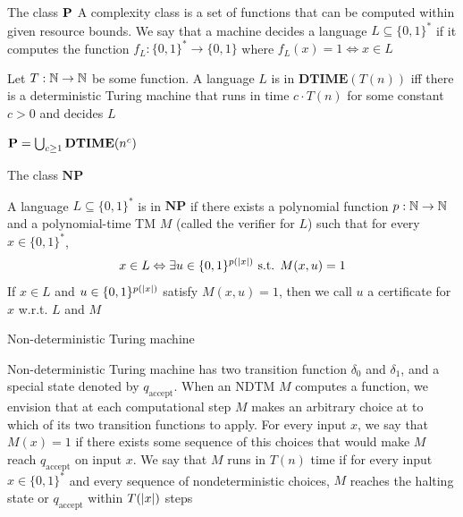 \documentclass[presentation]{beamer}
\def \NP {\textbf{NP}}
\def \DTIME {\textbf{DTIME}}
\def \NP {\textbf{NP}}
\def \accept {\text{accept}}
\begin{document}
\begin{frame}[label={sec:org68ce855}]{The class \texorpdfstring{\(\operatorname{\textbf{P}}\)}{P}}
A \alert{complexity class} is a set of functions that can be computed within given resource bounds. We
say that a machine \alert{decides} a language \(L\subseteq\{0,1\}^*\) if it computes the
function \(f_L:\{0,1\}^*\to\{0,1\}\) where \(f_L(x)=1\Leftrightarrow x\in L\)

\begin{definition}[]
Let \(T:\mathbb{N}\to\mathbb{N}\) be some function. A language \(L\) is in \(\DTIME(T(n))\) iff there is a
deterministic Turing machine that runs in time \(c\cdot T(n)\) for some constant \(c>0\) and decides \(L\)
\end{definition}

\begin{definition}[]
\(\bP=\bigcup_{c\ge 1}\DTIME(n^c)\)
\end{definition}
\end{frame}
\begin{frame}[label={sec:org444081b}]{The class \texorpdfstring{\(\NP\)}{NP}}
\begin{definition}[]
A language \(L\subseteq\{0,1\}^*\) is in \(\NP\) if there exists a polynomial function \(p:\mathbb{N}\to\mathbb{N}\) and a
polynomial-time TM \(M\) (called the \alert{verifier} for \(L\)) such that for every \(x\in\{0,1\}^*\),
\begin{equation*}
x\in L\Leftrightarrow\exists u\in\{0,1\}^{p(\abs{x})} \text{ s.t. } M(x,u)=1
\end{equation*}
If \(x\in L\) and \(u\in\{0,1\}^{p(\abs{x})}\) satisfy \(M(x,u)=1\), then we call \(u\) a \alert{certificate}
for \(x\) w.r.t. \(L\) and \(M\)
\end{definition}
\end{frame}
\begin{frame}[label={sec:org3c4e33f}]{Non-deterministic Turing machine}
\begin{definition}[]
\alert{Non-deterministic Turing machine} has \alert{two} transition function \(\delta_0\) and \(\delta_1\), and a special state denoted
by \(q_{\accept}\). When an NDTM \(M\) computes a function, we envision that at each
computational step \(M\) makes an arbitrary choice at to which of its two transition functions
to apply. For every input \(x\), we say that \(M(x)=1\) if there \alert{exists} some sequence of this
choices that would make \(M\) reach \(q_{\accept}\) on input \(x\). We say that \(M\) runs
in \(T(n)\) time if for every input \(x\in\{0,1\}^*\) and every sequence of nondeterministic
choices, \(M\) reaches the halting state or \(q_{\accept}\) within \(T(\abs{x})\) steps
\end{definition}
\end{frame}
\end{document}
